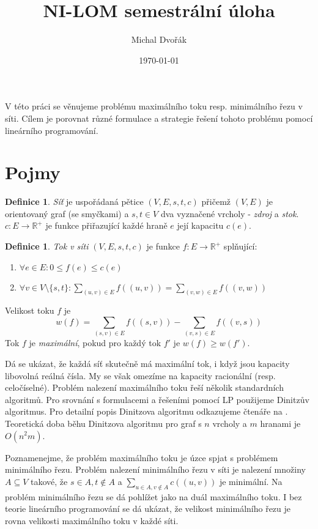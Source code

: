 \documentclass{article}
\title{NI-LOM semestrální úloha}
\author{Michal Dvořák}
\date{\today}
\theoremstyle{plain}
\theoremstyle{definition}
\newtheorem{defn}[thm]{Definice}
\begin{document}
\maketitle

V této práci se věnujeme problému maximálního toku resp. minimálního řezu v síti. Cílem je porovnat různé formulace a strategie řešení tohoto problému pomocí lineárního programování.

\section{Pojmy}

\begin{defn}
	\textit{Síť} je uspořádaná pětice $(V,E,s,t,c)$ přičemž $(V,E)$ je orientovaný graf (se smyčkami) a $s,t\in V$ dva vyznačené vrcholy - \textit{zdroj} a \textit{stok}. $c\colon E\rightarrow \mathbb{R}^+$ je funkce přiřazující každé hraně $e$ její kapacitu $c(e)$.
\end{defn}
\begin{defn}
	\textit{Tok v síti} $(V,E,s,t,c)$ je funkce $f\colon E\rightarrow \mathbb{R}^+$ splňující:
	\begin{enumerate}
		\item $\forall e \in E\colon 0\leq f(e)\leq c(e)$
		\item $\forall v\in V\setminus\{s,t\}\colon \sum_{(u,v)\in E} f((u,v))=\sum_{(v,w)\in E}f((v,w))$
	\end{enumerate}
	Velikost toku $f$ je
	$$
	w(f) = \sum_{(s,v)\in E}f((s,v))-\sum_{(v,s)\in E}f((v,s))
	$$
	Tok $f$ je \textit{maximální}, pokud pro každý tok $f'$ je $w(f)\geq w(f')$.
\end{defn}

Dá se ukázat, že každá síť skutečně má maximální tok, i když jsou kapacity libovolná reálná čísla. My se však omezíme na kapacity racionální (resp. celočíselné). Problém nalezení maximálního toku řeší několik standardních algoritmů. Pro srovnání s formulacemi a řešeními pomocí LP použijeme Dinitzův algoritmus. Pro detailní popis Dinitzova algoritmu odkazujeme čtenáře na \cite{labyrint}. Teoretická doba běhu Dinitzova algoritmu pro graf s $n$ vrcholy a $m$ hranami je $O(n^2m)$.


Poznamenejme, že problém maximálního toku je úzce spjat s problémem minimálního řezu. Problém nalezení minimálního řezu v síti je nalezení množiny $A\subseteq V$ takové, že $s\in A,t\notin A$ a $\sum_{u\in A,v\notin A}c((u,v))$ je minimální. Na problém minimálního řezu se dá pohlížet jako na duál maximálního toku. I bez teorie lineárního programování se dá ukázat, že velikost minimálního řezu je rovna velikosti maximálního toku v každé síti.
\end{document}
